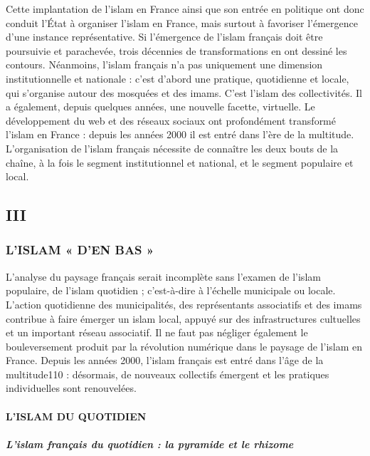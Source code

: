 Cette implantation de l'islam en France ainsi que son entrée en
politique ont donc conduit l'État à organiser l'islam en France, mais
surtout à favoriser l'émergence d'une instance représentative. Si
l'émergence de l'islam français doit être poursuivie et parachevée,
trois décennies de transformations en ont dessiné les contours.
Néanmoins, l'islam français n'a pas uniquement une dimension
institutionnelle et nationale : c'est d'abord une pratique, quotidienne
et locale, qui s'organise autour des mosquées et des imams. C'est
l'islam des collectivités. Il a également, depuis quelques années, une
nouvelle facette, virtuelle. Le développement du web et des réseaux
sociaux ont profondément transformé l'islam en France : depuis les
années 2000 il est entré dans l'ère de la multitude. L'organisation de
l'islam français nécessite de connaître les deux bouts de la chaîne, à
la fois le segment institutionnel et national, et le segment populaire
et local.


\hypertarget{iii}{%
\subsection{III}\label{iii}}

\hypertarget{lislam-den-bas}{%
\subsubsection{L'ISLAM « D'EN BAS »}\label{lislam-den-bas}}


L'analyse du paysage français serait incomplète sans l'examen de l'islam
populaire, de l'islam quotidien ; c'est-à-dire à l'échelle municipale ou
locale. L'action quotidienne des municipalités, des représentants
associatifs et des imams contribue à faire émerger un islam local,
appuyé sur des infrastructures cultuelles et un important réseau
associatif. Il ne faut pas négliger également le bouleversement produit
par la révolution numérique dans le paysage de l'islam en France. Depuis
les années 2000, l'islam français est entré dans l'âge de la
multitude110 : désormais, de nouveaux collectifs émergent et les
pratiques individuelles sont renouvelées.


\hypertarget{lislam-du-quotidien}{%
\paragraph{L'ISLAM DU QUOTIDIEN}\label{lislam-du-quotidien}}

\hypertarget{lislam-franuxe7ais-du-quotidien-la-pyramide-et-le-rhizome}{%
\subparagraph{L'islam français du quotidien : la pyramide et le
rhizome}\label{lislam-franuxe7ais-du-quotidien-la-pyramide-et-le-rhizome}}


